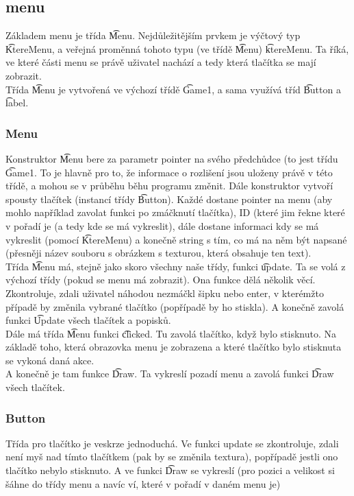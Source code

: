 \subsection{menu}
Základem menu je třída \t{Menu}. Nejdůležitějším prvkem je výčtový typ \t{KtereMenu}, a veřejná proměnná tohoto typu (ve třídě \t{Menu}) \t{ktereMenu}. Ta říká, ve které části menu se právě uživatel nachází a tedy která tlačítka se mají zobrazit.\\
Třída \t{Menu} je vytvořená ve výchozí třídě \t{Game1}, a sama využívá tříd \t{Button} a \t{label}. \\
\subsubsection{Menu}
Konstruktor \t{Menu} bere za parametr pointer na svého předchůdce (to jest třídu \t{Game1}. To je hlavně pro to, že informace o rozlišení jsou uloženy právě v této třídě, a mohou se v průběhu běhu programu změnit. Dále konstruktor vytvoří spousty tlačítek (instancí třídy \t{Button}). Každé dostane pointer na menu (aby mohlo například zavolat funkci po zmáčknutí tlačítka), ID (které jim řekne které v pořadí je (a tedy kde se má vykreslit), dále dostane informaci kdy se má vykreslit (pomocí \t{KtereMenu}) a konečně string s tím, co má na něm být napsané (přesněji název souboru s obrázkem s texturou, která obsahuje ten text). \\
Třída \t{Menu} má, stejně jako skoro všechny naše třídy, funkci \t{update}. Ta se volá z výchozí třídy (pokud se menu má zobrazit). Ona funkce dělá několik věcí. Zkontroluje, zdali uživatel náhodou nezmáčkl šipku nebo enter, v kterémžto případě by změnila vybrané tlačítko (popřípadě by ho stiskla). A konečně zavolá funkci \t{Update} všech tlačítek a popisků.  \\
Dále má třída \t{Menu} funkci \t{clicked}. Tu zavolá tlačítko, když bylo stisknuto. Na základě toho, která obrazovka menu je zobrazena a které tlačítko bylo stisknuta se vykoná daná akce. \\
A konečně je tam funkce \t{Draw}. Ta vykreslí pozadí menu a zavolá funkci \t{Draw} všech tlačítek.
\subsubsection{Button}
Třída pro tlačítko je veskrze jednoduchá. Ve funkci update se zkontroluje, zdali není myš nad tímto tlačítkem (pak by se změnila textura), popřípadě jestli ono tlačítko nebylo stisknuto. A ve funkci \t{Draw} se vykreslí (pro pozici a velikost si šáhne do třídy menu a navíc ví, které v pořadí v daném menu je)
